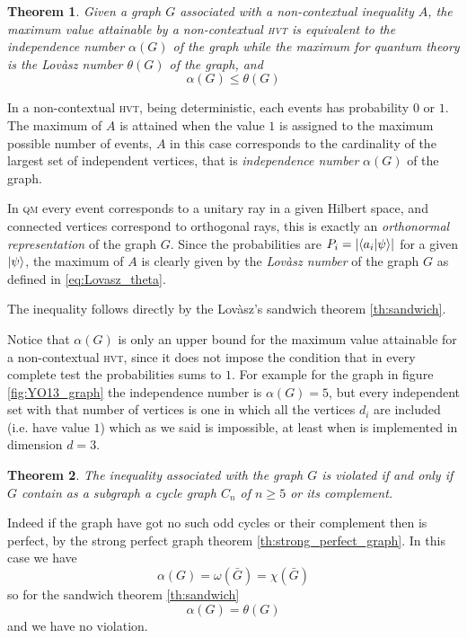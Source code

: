 \documentclass[a4paper]{article}
\newcommand{\abs}[1]{\lvert #1 \rvert}
\newcommand{\acron}[1]{\textsc{#1}}
\newcommand{\HVT}{\acron{hvt}}
\newcommand{\QM}{\acron{qm}}
\newtheorem{theorem}{Theorem}[section]
\theoremstyle{definition}
\let\oldproof\proof
\let\oldendproof\endproof
\renewenvironment{proof}
    {
        \begin{framed} 
        \oldproof
    }
    {
        \oldendproof 
        \end{framed}
    }
\begin{document}
\begin{theorem}
    Given a graph $G$ associated with a non-contextual inequality $A$, the maximum value
    attainable by a non-contextual \HVT{} is equivalent to the independence number
    $\alpha(G)$ of the graph while the maximum for quantum theory is the Lovàsz number
    $\theta(G)$ of the graph, and
    \begin{equation}
        \alpha(G) \le \theta(G)
    \end{equation}
    \label{th:nc_graph_indilov}
\end{theorem}
\begin{proof}
    In a non-contextual \HVT{}, being deterministic, each events has probability
    $0$ or $1$.
    The maximum of $A$ is attained when the value $1$ is assigned to the maximum
    possible number of events, $A$ in this case corresponds to the cardinality
    of the largest set of independent vertices, that is \emph{independence
    number} $\alpha(G)$ of the graph.

    In \QM{} every event corresponds to a unitary ray in a given Hilbert space,
    and connected vertices correspond to orthogonal rays, this is exactly an
    \emph{orthonormal representation} of the graph $G$.
    Since the probabilities are $P_i = \abs{\braket{a_i | \psi}}$ for a
    given $\Ket{\psi}$, the maximum of $A$ is clearly given by the
    \emph{Lovàsz number} of the graph $G$ as defined in
    \eqref{eq:Lovasz_theta}.

    The inequality follows directly by the Lovàsz's sandwich theorem
    \ref{th:sandwich}.
\end{proof}
Notice that $\alpha(G)$ is only an upper bound for the maximum value attainable
for a non-contextual \HVT{}, since it does not impose the condition that in every
complete test the probabilities sums to $1$.
For example for the graph in figure \ref{fig:YO13_graph} the independence number
is $\alpha(G) = 5$, but every independent set with that number of vertices is one
in which all the vertices $d_i$ are included (i.e. have value $1$) which as we
said is impossible, at least when is implemented in dimension $d=3$.

\begin{theorem}
    The inequality associated with the graph $G$ is violated if and only if $G$
    contain as a subgraph a cycle graph $C_n$ of $n\ge5$ or its complement.
    \label{th:nc_graph_indinum}
\end{theorem}
\begin{proof}
    Indeed if the graph have got no such odd cycles or their complement then is
    perfect, by the strong perfect graph theorem \ref{th:strong_perfect_graph}.
    In this case we have
    \begin{equation}
        \alpha(G) = \omega(\bar G) = \chi(\bar G)
    \end{equation}
    so for the sandwich theorem \ref{th:sandwich}
    \begin{equation}
        \alpha(G) = \theta(G)
    \end{equation}
    and we have no violation.
\end{proof}
\appendix
\end{document}
